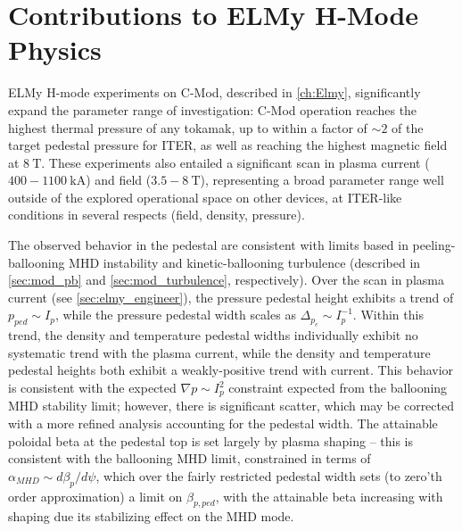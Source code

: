 \section{Contributions to ELMy H-Mode Physics}\label{sec:conc_elmy}

ELMy H-mode experiments on C-Mod, described in \cref{ch:Elmy}, significantly expand the parameter range of investigation: C-Mod operation reaches the highest thermal pressure of any tokamak, up to within a factor of $\sim 2$ of the target pedestal pressure for ITER, as well as reaching the highest magnetic field at $\SI{8}{\tesla}$.  These experiments also entailed a significant scan in plasma current ($400-\SI{1100}{\kilo\ampere}$) and field ($3.5-\SI{8}{\tesla}$), representing a broad parameter range well outside of the explored operational space on other devices, at ITER-like conditions in several respects (\eg field, density, pressure).

The observed behavior in the pedestal are consistent with limits based in peeling-ballooning MHD instability and kinetic-ballooning turbulence (described in \cref{sec:mod_pb} and \cref{sec:mod_turbulence}, respectively).  Over the scan in plasma current (see \cref{sec:elmy_engineer}), the pressure pedestal height exhibits a trend of $p_{ped} \sim I_p$, while the pressure pedestal width scales as $\Delta_{p_e} \sim I_p^{-1}$.  Within this trend, the density and temperature pedestal widths individually exhibit no systematic trend with the plasma current, while the density and temperature pedestal heights both exhibit a weakly-positive trend with current.  This behavior is consistent with the expected $\nabla p \sim I_p^2$ constraint expected from the ballooning MHD stability limit; however, there is significant scatter, which may be corrected with a more refined analysis accounting for the pedestal width.  The attainable poloidal beta at the pedestal top is set largely by plasma shaping -- this is consistent with the ballooning MHD limit, constrained in terms of $\alpha_{MHD} \sim d\beta_{p}/d\psi$, which over the fairly restricted pedestal width sets (to zero'th order approximation) a limit on $\beta_{p,ped}$, with the attainable beta increasing with shaping due its stabilizing effect on the MHD mode.

